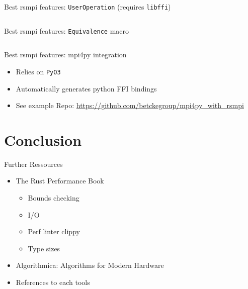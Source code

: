 \documentclass[compress,aspectratio=169]{beamer}
\begin{document}
\begin{frame}{Best rsmpi features: \texttt{UserOperation} (requires \texttt{libffi})}
  \begin{tcolorbox}
    \footnotesize\inputminted[xleftmargin=1em,linenos]{rust}{./assets/userop.rs}
  \end{tcolorbox}
\end{frame}

\begin{frame}{Best rsmpi features: \texttt{Equivalence} macro}
  \begin{tcolorbox}
    \footnotesize\inputminted[xleftmargin=1em,linenos]{rust}{./assets/eq.rs}
  \end{tcolorbox}
\end{frame}

\begin{frame}{Best rsmpi features: mpi4py integration}
  \begin{itemize}
    \item Relies on \texttt{PyO3}
    \item Automatically generates python FFI bindings
    \item See example Repo: \url{https://github.com/betckegroup/mpi4py_with_rsmpi}
  \end{itemize}
\end{frame}

\section{Conclusion}
\begin{frame}{Further Ressources}
  \begin{itemize}
    \item The Rust Performance Book \cite{perfbook}
      \begin{itemize}
        \item Bounds checking
        \item I/O
        \item Perf linter clippy
        \item Type sizes
      \end{itemize}
      \pause
    \item Algorithmica: Algorithms for Modern Hardware \cite{algorithmica}
      \pause
    \item References to each tools
  \end{itemize}
\end{frame}
\end{document}

